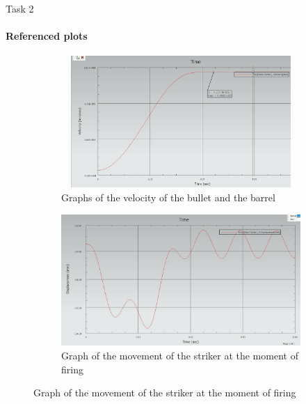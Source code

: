 \documentclass[aspectratio=169]{beamer}
\newcommand{\fbckg}[1]{\usebackgroundtemplate{\texttt{[image: \#1]}}}%
\begin{document}
\begin{frame}[t]{Task 2}
    \framesubtitle{Referenced plots}
    \vspace{-0.6cm}
    \begin{figure}[H]
        \begin{subfigure}{0.49\textwidth}
            \centering\includegraphics[height=5cm,width=1\textwidth,keepaspectratio]{resources/var1_1.jpeg}
            \caption{Graphs of the velocity of the bullet and the barrel}
            \label{fig:var1_1.jpeg}
        \end{subfigure}
        \begin{subfigure}{0.49\textwidth}
            \centering\includegraphics[height=5cm,width=1\textwidth,keepaspectratio]{resources/var1_2.jpeg}
            \caption{Graph of the movement of the striker at the moment of firing}
            \label{fig:var1_2.jpeg}
        \end{subfigure}
    \end{figure}
\end{frame}

\fbckg{fibeamer/figs/last_page.png}
\frame[plain]{}
\end{document}
